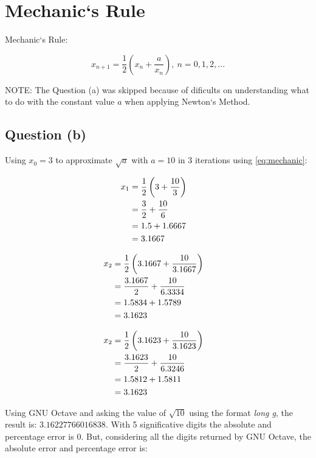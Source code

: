 \section{Mechanic`s Rule}
	
	Mechanic`s Rule:

	\begin{equation}
		x_{n+1} = \frac{1}{2}\left( x_{n} + \frac{a}{x_{n}} \right),\ n=0,1,2,...
	\label{eq:mechanic}
	\end{equation}

	NOTE: The Question (a) was skipped because of dificults on understanding what to do with the constant value $a$ when applying Newton`s Method.

	\subsection{Question (b)}

		Using $x_{0} = 3$ to approximate $\sqrt{a}$ with $a = 10$ in 3 iterations using \cref{eq:mechanic}:
		
		\begin{align}
			x_{1} &= \frac{1}{2}\left( 3 + \frac{10}{3} \right)& \notag \\
			&= \frac{3}{2} + \frac{10}{6}& \notag \\
			&= 1.5 + 1.6667& \notag \\
			&= 3.1667&
			\label{eq:qfourxone}
		\end{align}

		\begin{align}
			x_{2} &= \frac{1}{2}\left( 3.1667 + \frac{10}{3.1667} \right)& \notag \\
			&= \frac{3.1667}{2} + \frac{10}{6.3334}& \notag \\
			&= 1.5834 + 1.5789& \notag \\
			&= 3.1623&
			\label{eq:qfourxtwo}
		\end{align}

		\begin{align}
			x_{2} &= \frac{1}{2}\left( 3.1623 + \frac{10}{3.1623} \right)& \notag \\
			&= \frac{3.1623}{2} + \frac{10}{6.3246}& \notag \\
			&= 1.5812 + 1.5811& \notag \\
			&= 3.1623&
			\label{eq:qfourxthree}
		\end{align}

		Using GNU Octave and asking the value of $\sqrt{10}$ using the format \emph{long g}, the result is: $3.16227766016838$. With 5 significative digits the absolute and percentage error is 0. But, considering all the digits returned by GNU Octave, the absolute error and percentage error is:

